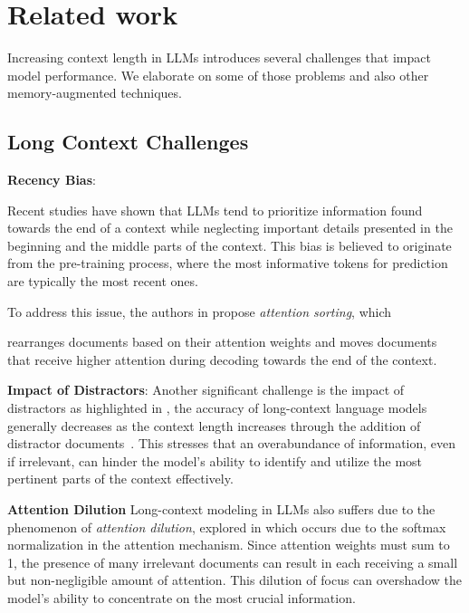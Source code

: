 \section{Related work}
\label{sec:related_work}

Increasing context length in LLMs introduces several challenges that impact model performance. We elaborate on some of those problems and also other memory-augmented techniques. 

\subsection{Long Context Challenges}
\textbf{Recency Bias}: 

Recent studies\cite{recency_bias1, recency_bias2, recency_bias3, recency_bias4} have shown that LLMs tend to prioritize information found towards the end of a context while neglecting important details presented in the beginning and the middle parts of the context. 
This bias is believed to originate from the pre-training process, where the most informative tokens for prediction are typically the most recent ones. 

To address this issue, the authors in \cite{attention_sorting} propose \textit{attention sorting}, which

rearranges documents based on their attention weights and moves documents that receive higher attention during decoding towards the end of the context.


\textbf{Impact of Distractors}: 
Another significant challenge is the impact of distractors as highlighted in \cite{attention_sorting}, the accuracy of long-context language models generally decreases as the context length increases through the addition of distractor documents~\cite{distractor2, distractor_rag, distract_long_context}. This stresses that an overabundance of information, even if irrelevant, can hinder the model's ability to identify and utilize the most pertinent parts of the context effectively.

\textbf{Attention Dilution}
Long-context modeling in LLMs also suffers due to the phenomenon of \textit{attention dilution}, explored in \cite{attention_dilution1,attention_dilution2,attention_dilution3,attention_dilution4} which occurs due to the softmax normalization in the attention mechanism. Since attention weights must sum to 1, the presence of many irrelevant documents can result in each receiving a small but non-negligible amount of attention. This dilution of focus can overshadow the model's ability to concentrate on the most crucial information.

